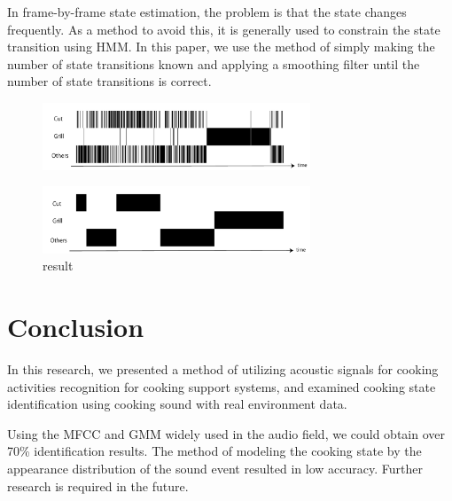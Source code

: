 \documentclass[sigconf,anonymous]{acmart}
\begin{document}
In frame-by-frame state estimation, the problem is that the state changes frequently. As a method to avoid this, it is generally used to constrain the state transition using HMM.
In this paper, we use the method of simply making the number of state transitions known and applying a smoothing filter until the number of state transitions is correct.

\begin{figure}[t]
  \centering
  \includegraphics[width=8cm]{fig/N63_m4.pdf}
  \caption{}
  \Description{}
  \label{baseine_timeline_result}
\end{figure}

\begin{figure}[t]
  \centering
  \includegraphics[width=8cm]{fig/N63_m4_smoothed.pdf}
  \caption{result}
  \Description{}
  \label{baseine_timeline_smoothed_result}
\end{figure}


\section{Conclusion}
In this research, we presented a method of utilizing acoustic signals for cooking activities recognition for cooking support systems, and examined cooking state identification using cooking sound with real environment data.

Using the MFCC and GMM widely used in the audio field, we could obtain over 70\% identification results.
The method of modeling the cooking state by the appearance distribution of the sound event resulted in low accuracy. Further research is required in the future.
\end{document}
